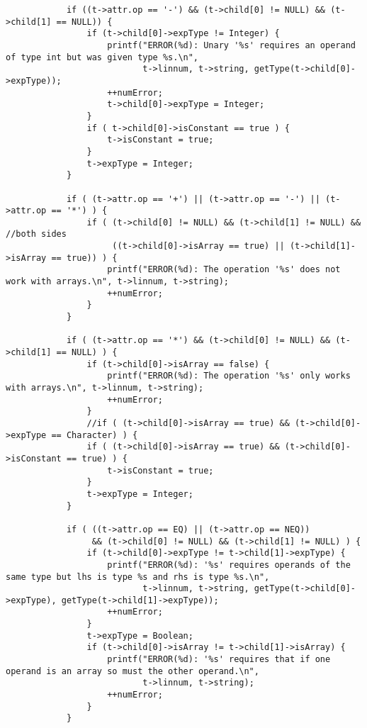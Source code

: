 \documentclass[12pt]{book}
\begin{document}
\begin{lstlisting}
            if ((t->attr.op == '-') && (t->child[0] != NULL) && (t->child[1] == NULL)) {
                if (t->child[0]->expType != Integer) {
                    printf("ERROR(%d): Unary '%s' requires an operand of type int but was given type %s.\n", 
                           t->linnum, t->string, getType(t->child[0]->expType));	       
                    ++numError;
                    t->child[0]->expType = Integer; 
                }
                if ( t->child[0]->isConstant == true ) {
                    t->isConstant = true;
                }
                t->expType = Integer;
            }

            if ( (t->attr.op == '+') || (t->attr.op == '-') || (t->attr.op == '*') ) {
                if ( (t->child[0] != NULL) && (t->child[1] != NULL) && //both sides
                     ((t->child[0]->isArray == true) || (t->child[1]->isArray == true)) ) {
                    printf("ERROR(%d): The operation '%s' does not work with arrays.\n", t->linnum, t->string);
                    ++numError;
                } 
            } 

            if ( (t->attr.op == '*') && (t->child[0] != NULL) && (t->child[1] == NULL) ) {
                if (t->child[0]->isArray == false) {
                    printf("ERROR(%d): The operation '%s' only works with arrays.\n", t->linnum, t->string);
                    ++numError;
                }
                //if ( (t->child[0]->isArray == true) && (t->child[0]->expType == Character) ) {
                if ( (t->child[0]->isArray == true) && (t->child[0]->isConstant == true) ) {
                    t->isConstant = true;
                }
                t->expType = Integer; 
            }

            if ( ((t->attr.op == EQ) || (t->attr.op == NEQ))
                 && (t->child[0] != NULL) && (t->child[1] != NULL) ) {
                if (t->child[0]->expType != t->child[1]->expType) {
                    printf("ERROR(%d): '%s' requires operands of the same type but lhs is type %s and rhs is type %s.\n", 
                           t->linnum, t->string, getType(t->child[0]->expType), getType(t->child[1]->expType));
                    ++numError;
                } 
                t->expType = Boolean;
                if (t->child[0]->isArray != t->child[1]->isArray) {
                    printf("ERROR(%d): '%s' requires that if one operand is an array so must the other operand.\n", 
                           t->linnum, t->string);
                    ++numError;
                }
            }


\end{lstlisting}
\end{document}
